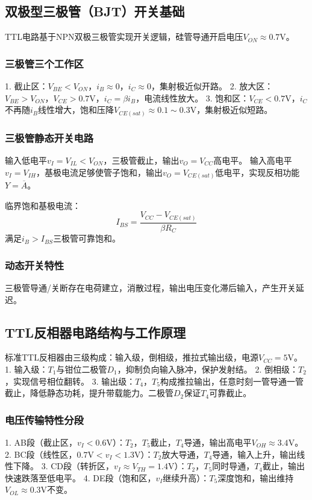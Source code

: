 \subsection{双极型三极管（BJT）开关基础}
TTL电路基于NPN双极三极管实现开关逻辑，硅管导通开启电压\(V_{ON}\approx0.7\mathrm{V}\)。

\subsubsection{三极管三个工作区}
1. 截止区：\(V_{BE}<V_{ON}\)，\(i_B\approx0\)，\(i_C\approx0\)，集射极近似开路。
2. 放大区：\(V_{BE}>V_{ON}\)，\(V_{CE}>0.7\mathrm{V}\)，\(i_C=\beta i_B\)，电流线性放大。
3. 饱和区：\(V_{CE}<0.7\mathrm{V}\)，\(i_C\)不再随\(i_B\)线性增大，饱和压降\(V_{CE(sat)}\approx0.1\sim0.3\mathrm{V}\)，集射极近似短路。

\subsubsection{三极管静态开关电路}
输入低电平\(v_I=V_{IL}<V_{ON}\)，三极管截止，输出\(v_O=V_{CC}\)高电平。
输入高电平\(v_I=V_{IH}\)，基极电流足够使管子饱和，输出\(v_O=V_{CE(sat)}\)低电平，实现反相功能\(Y=\overline{A}\)。

临界饱和基极电流：
\[
I_{BS}=\frac{V_{CC}-V_{CE(sat)}}{\beta R_C}
\]
满足\(i_B>I_{BS}\)三极管可靠饱和。

\subsubsection{动态开关特性}
三极管导通/关断存在电荷建立，消散过程，输出电压变化滞后输入，产生开关延迟。

\subsection{TTL反相器电路结构与工作原理}
标准TTL反相器由三级构成：输入级，倒相级，推拉式输出级，电源\(V_{CC}=5\mathrm{V}\)。
1. 输入级：\(T_1\)与钳位二极管\(D_1\)，抑制负向输入脉冲，保护发射结。
2. 倒相级：\(T_2\)，实现信号相位翻转。
3. 输出级：\(T_4\)，\(T_5\)构成推拉输出，任意时刻一管导通一管截止，降低静态功耗，提升带载能力。二极管\(D_2\)保证\(T_4\)可靠截止。

\subsubsection{电压传输特性分段}
1. AB段（截止区，\(v_I<0.6\mathrm{V}\)）：\(T_2\)，\(T_5\)截止，\(T_4\)导通，输出高电平\(V_{OH}\approx3.4\mathrm{V}\)。
2. BC段（线性区，\(0.7\mathrm{V}<v_I<1.3\mathrm{V}\)）：\(T_2\)放大导通，\(T_4\)导通，输入上升，输出线性下降。
3. CD段（转折区，\(v_I\approx V_{TH}=1.4\mathrm{V}\)）：\(T_2\)，\(T_5\)同时导通，\(T_4\)截止，输出快速跌落至低电平。
4. DE段（饱和区，\(v_I\)继续升高）：\(T_5\)深度饱和，输出维持\(V_{OL}\approx0.3\mathrm{V}\)不变。


